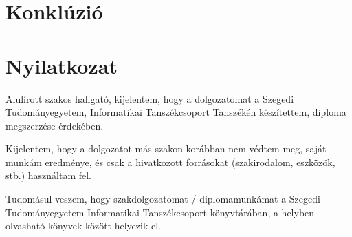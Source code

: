 \documentclass[12pt]{report}
\theoremstyle{definition}
\begin{document}
    \chapter{Konklúzió}



    {}
    


    \chapter*{Nyilatkozat}




    \noindent

Alulírott \makebox[4cm]{\dotfill} szakos hallgató, kijelentem, hogy a dolgozatomat a Szegedi Tudományegyetem, Informatikai Tanszékcsoport \makebox[4cm]{\dotfill} Tanszékén készítettem, \makebox[4cm]{\dotfill} diploma megszerzése érdekében.

Kijelentem, hogy a dolgozatot más szakon korábban nem védtem meg, saját munkám eredménye, és csak a hivatkozott forrásokat (szakirodalom, eszközök, stb.) használtam fel.

Tudomásul veszem, hogy szakdolgozatomat / diplomamunkámat a Szegedi Tudományegyetem Informatikai Tanszékcsoport könyvtárában, a helyben olvasható könyvek között helyezik el.
\end{document}
